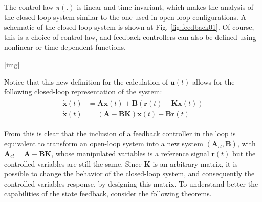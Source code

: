 \documentclass[a4paper,11pt]{book}
\numberwithin{figure}{chapter}
\numberwithin{equation}{chapter}
\numberwithin{table}{chapter}
\theoremstyle{definition}
\begin{document}
The control law $\pi(.)$ is linear and time-invariant, which makes the analysis of the closed-loop system similar to the one used in open-loop configurations. A schematic of the closed-loop system is shown at Fig. \ref{fig:feedback01}. Of course, this is a choice of control law, and feedback controllers can also be defined using nonlinear or time-dependent functions. 

[img]

Notice that this new definition for the calculation of $\bm{u}(t)$ allows for the following closed-loop representation of the system:
\begin{align}
\begin{split}
	\dot{\bm{x}}(t) &= \bm{A} \bm{x}(t) + \bm{B} \left( \bm{r}(t) - \bm{K} \bm{x}(t) \right) \\
	\dot{\bm{x}}(t) &= \left( \bm{A} - \bm{B} \bm{K} \right) \bm{x}(t) + \bm{B} \bm{r}(t)
\end{split}
\end{align}

From this is clear that the inclusion of a feedback controller in the loop is equivalent to transform an open-loop system into a new system $(\bm{A}_{cl}, \bm{B})$, with $\bm{A}_{cl} = \bm{A} - \bm{B} \bm{K}$, whose manipulated variables is a reference signal $\bm{r}(t)$ but the controlled variables are still the same. Since $\bm{K}$ is an arbitrary matrix, it is possible to change the behavior of the closed-loop system, and consequently the controlled variables response, by designing this matrix. To understand better the capabilities of the state feedback, consider the following theorems.
\end{document}
